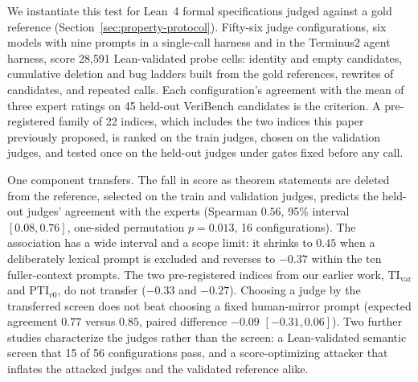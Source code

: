 We instantiate this test for Lean~4 formal specifications judged against a gold reference (Section~\ref{sec:property-protocol}).
Fifty-six judge configurations, six models with nine prompts in a single-call harness and in the Terminus2 agent harness, score 28{,}591 Lean-validated probe cells: identity and empty candidates, cumulative deletion and bug ladders built from the gold references, rewrites of candidates, and repeated calls.
Each configuration's agreement with the mean of three expert ratings on 45 held-out VeriBench candidates is the criterion.
A pre-registered family of 22 indices, which includes the two indices this paper previously proposed, is ranked on the train judges, chosen on the validation judges, and tested once on the held-out judges under gates fixed before any call.

One component transfers.
The fall in score as theorem statements are deleted from the reference, selected on the train and validation judges, predicts the held-out judges' agreement with the experts (Spearman $0.56$, 95\% interval $[0.08, 0.76]$, one-sided permutation $p = 0.013$, 16 configurations).
The association has a wide interval and a scope limit: it shrinks to $0.45$ when a deliberately lexical prompt is excluded and reverses to $-0.37$ within the ten fuller-context prompts.
The two pre-registered indices from our earlier work, $\mathrm{TI}_{\mathrm{var}}$ and $\mathrm{PTI}_{v0}$, do not transfer ($-0.33$ and $-0.27$).
Choosing a judge by the transferred screen does not beat choosing a fixed human-mirror prompt (expected agreement $0.77$ versus $0.85$, paired difference $-0.09$ $[-0.31, 0.06]$).
Two further studies characterize the judges rather than the screen: a Lean-validated semantic screen that 15 of 56 configurations pass, and a score-optimizing attacker that inflates the attacked judges and the validated reference alike.

